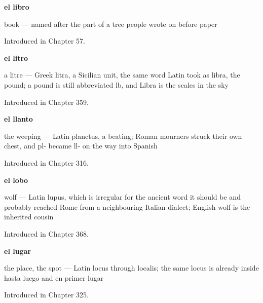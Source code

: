 \noindent\begin{minipage}[t]{\linewidth}
\raggedright
\textbf{el libro}\par
\small book — named after the part of a tree people wrote on before paper\par
\footnotesize Introduced in Chapter 57.
\end{minipage}\par\medskip

\noindent\begin{minipage}[t]{\linewidth}
\raggedright
\textbf{el litro}\par
\small a litre — Greek litra, a Sicilian unit, the same word Latin took as libra, the pound; a pound is still abbreviated lb, and Libra is the scales in the sky\par
\footnotesize Introduced in Chapter 359.
\end{minipage}\par\medskip

\noindent\begin{minipage}[t]{\linewidth}
\raggedright
\textbf{el llanto}\par
\small the weeping — Latin planctus, a beating; Roman mourners struck their own chest, and pl- became ll- on the way into Spanish\par
\footnotesize Introduced in Chapter 316.
\end{minipage}\par\medskip

\noindent\begin{minipage}[t]{\linewidth}
\raggedright
\textbf{el lobo}\par
\small wolf — Latin lupus, which is irregular for the ancient word it should be and probably reached Rome from a neighbouring Italian dialect; English wolf is the inherited cousin\par
\footnotesize Introduced in Chapter 368.
\end{minipage}\par\medskip

\noindent\begin{minipage}[t]{\linewidth}
\raggedright
\textbf{el lugar}\par
\small the place, the spot — Latin locus through localis; the same locus is already inside hasta luego and en primer lugar\par
\footnotesize Introduced in Chapter 325.
\end{minipage}\par\medskip

